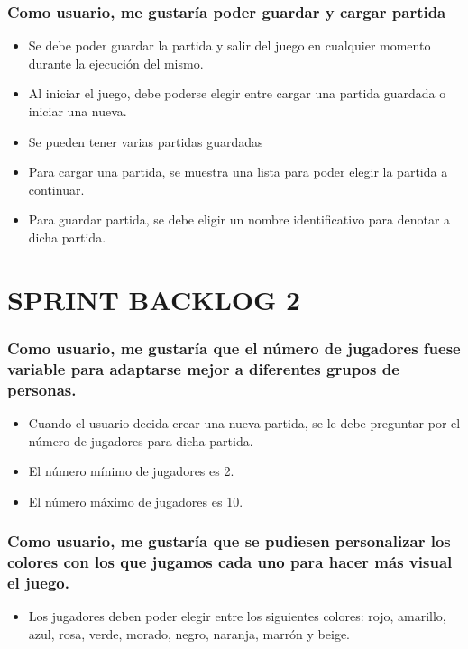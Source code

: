 \documentclass{article}
\begin{document}
\subsubsection*{Como usuario, me gustaría poder guardar y cargar partida}
\begin{itemize}
\item Se debe poder guardar la partida y salir del juego en cualquier momento durante la ejecución del mismo.
\item Al iniciar el juego, debe poderse elegir entre cargar una partida guardada o iniciar una nueva.
\item Se pueden tener varias partidas guardadas
\item Para cargar una partida, se muestra una lista para poder elegir la partida a continuar.
\item Para guardar partida, se debe eligir un nombre identificativo para denotar a dicha partida.
\end{itemize}

\newpage
\section*{SPRINT BACKLOG 2}
\subsubsection*{Como usuario, me gustaría que el número de jugadores fuese variable para adaptarse mejor a diferentes grupos de personas.}

\begin{itemize}
\item Cuando el usuario decida crear una nueva partida, se le debe preguntar por el número de jugadores para dicha partida.

\item El número mínimo de jugadores es 2.

\item El número máximo de jugadores es 10.

\end{itemize}

\subsubsection*{Como usuario, me gustaría que se pudiesen personalizar los colores con los que jugamos cada uno para hacer más visual el juego.}
\begin{itemize}

\item Los jugadores deben poder elegir entre los siguientes colores: rojo, amarillo, azul, rosa, verde, morado, negro, naranja, marrón y beige.

\end{itemize}
\end{document}
